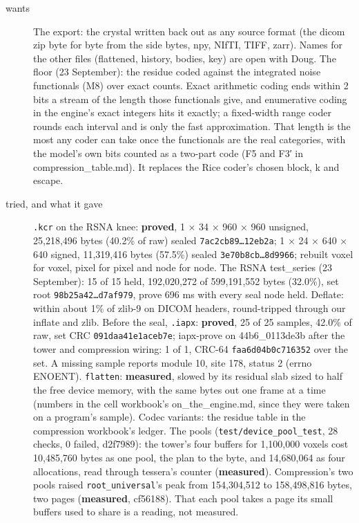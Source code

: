 \begin{description}
\item[{wants}] The export: the crystal written back out as any source format (the dicom zip byte for byte from the side bytes, npy, NIfTI, TIFF, zarr). Names for the other files (flattened, history, bodies, key) are open with Doug. The floor (23 September): the residue coded against the integrated noise functionals (M8) over exact counts. Exact arithmetic coding ends within 2 bits a stream of the length those functionals give, and enumerative coding in the engine's exact integers hits it exactly; a fixed-width range coder rounds each interval and is only the fast approximation. That length is the most any coder can take once the functionals are the real categories, with the model's own bits counted as a two-part code (F5 and F3′ in compression\_\allowbreak{}table.md). It replaces the Rice coder's chosen block, k and escape.
\item[{tried, and what it gave}] \texttt{.\allowbreak{}kcr} on the RSNA knee: \textbf{proved}, 1 × 34 × 960 × 960 unsigned, 25,218,496 bytes (40.2\% of raw) sealed \texttt{7ac2cb89…12eb2a}; 1 × 24 × 640 × 640 signed, 11,319,416 bytes (57.5\%) sealed \texttt{3e70b8cb…8d9966}; rebuilt voxel for voxel, pixel for pixel and node for node. The RSNA test\_\allowbreak{}series (23 September): 15 of 15 held, 192,020,272 of 599,191,552 bytes (32.0\%), set root \texttt{98b25a42…d7af979}, prove 696 ms with every seal node held. Deflate: within about 1\% of zlib-9 on DICOM headers, round-tripped through our inflate and zlib. Before the seal, \texttt{.\allowbreak{}iapx}: \textbf{proved}, 25 of 25 samples, 42.0\% of raw, set CRC \texttt{091daa41e1aceb7e}; iapx-prove on 44b6\_\allowbreak{}0113de3b after the tower and compression wiring: 1 of 1, CRC-64 \texttt{faa6d04b0c716352} over the set. A missing sample reports module 10, site 178, status 2 (errno ENOENT). \texttt{flatten}: \textbf{measured}, slowed by its residual slab sized to half the free device memory, with the same bytes out one frame at a time (numbers in the cell workbook's on\_\allowbreak{}the\_\allowbreak{}engine.md, since they were taken on a program's sample). Codec variants: the residue table in the compression workbook's ledger. The pools (\texttt{test/\allowbreak{}device\_\allowbreak{}pool\_\allowbreak{}test}, 28 checks, 0 failed, d2f7989): the tower's four buffers for 1,100,000 voxels cost 10,485,760 bytes as one pool, the plan to the byte, and 14,680,064 as four allocations, read through tessera's counter (\textbf{measured}). Compression's two pools raised \texttt{root\_\allowbreak{}universal}'s peak from 154,304,512 to 158,498,816 bytes, two pages (\textbf{measured}, cf56188). That each pool takes a page its small buffers used to share is a reading, not measured.

\end{description}
